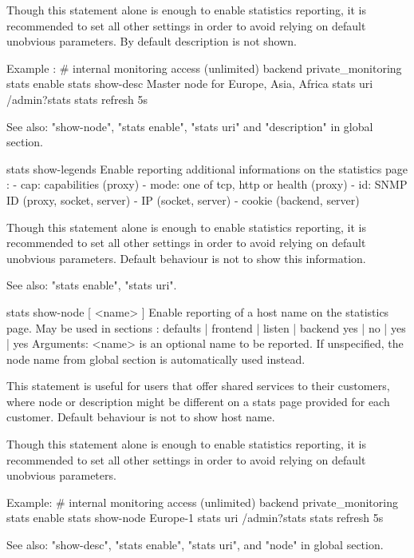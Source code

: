   Though this statement alone is enough to enable statistics reporting, it is
  recommended to set all other settings in order to avoid relying on default
  unobvious parameters.  By default description is not shown.

  Example :
    # internal monitoring access (unlimited)
    backend private_monitoring
        stats enable
        stats show-desc Master node for Europe, Asia, Africa
        stats uri       /admin?stats
        stats refresh   5s

  See also: "show-node", "stats enable", "stats uri" and "description" in
            global section.


stats show-legends
  Enable reporting additional informations on the statistics page :
    - cap: capabilities (proxy)
    - mode: one of tcp, http or health (proxy)
    - id: SNMP ID (proxy, socket, server)
    - IP (socket, server)
    - cookie (backend, server)

  Though this statement alone is enough to enable statistics reporting, it is
  recommended to set all other settings in order to avoid relying on default
  unobvious parameters.  Default behaviour is not to show this information.

  See also: "stats enable", "stats uri".


stats show-node [ <name> ]
  Enable reporting of a host name on the statistics page.
  May be used in sections :   defaults | frontend | listen | backend
                                 yes   |    no    |   yes  |   yes
  Arguments:
    <name>    is an optional name to be reported. If unspecified, the
              node name from global section is automatically used instead.

  This statement is useful for users that offer shared services to their
  customers, where node or description might be different on a stats page
  provided for each customer.  Default behaviour is not to show host name.

  Though this statement alone is enough to enable statistics reporting, it is
  recommended to set all other settings in order to avoid relying on default
  unobvious parameters.

  Example:
    # internal monitoring access (unlimited)
    backend private_monitoring
        stats enable
        stats show-node Europe-1
        stats uri       /admin?stats
        stats refresh   5s

  See also: "show-desc", "stats enable", "stats uri", and "node" in global
            section.


